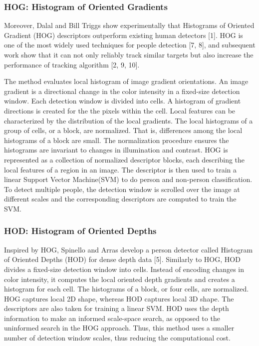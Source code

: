 \documentclass[paper=a4, fontsize=11pt]{scrartcl}
\numberwithin{equation}{section}		%
\numberwithin{figure}{section}			%
\numberwithin{table}{section}				%
\begin{document}
\subsubsection{HOG: Histogram of Oriented Gradients}

Moreover, Dalal and Bill Triggs show experimentally that Histograms of Oriented Gradient (HOG) descriptors outperform existing human detectors [1]. HOG is one of the most widely used techniques for people detection [7, 8], and subsequent work show that it can not only reliably track similar targets but also increase the performance of tracking algorithm [2, 9, 10].

The method evaluates local histogram of image gradient orientations. An image gradient is a directional change in the color intensity in a fixed-size detection window. Each detection window is divided into cells. A histogram of gradient directions is created for the the pixels within the cell. Local features can be characterized by the distribution of the local gradients. The local histograms of a group of cells, or a block, are normalized. That is, differences among the local histograms of a block are small. The normalization procedure ensures the histograms are invariant to changes in illumination and contrast. HOG is represented as a collection of normalized descriptor blocks, each describing the local features of a region in an image. The descriptor is then used to train a linear Support Vector Machine(SVM) to do person and non-person classification. To detect multiple people, the detection window is scrolled over the image at different scales and the corresponding descriptors are computed to train the SVM.

\subsubsection{HOD: Histogram of Oriented Depths}

Inspired by HOG, Spinello and Arras develop a person detector called Histogram of Oriented Depths (HOD) for dense depth data [5]. Similarly to HOG, HOD divides a fixed-size detection window into cells. Instead of encoding changes in color intensity, it computes the local oriented depth gradients and creates a histogram for each cell. The histograms of a block, or four cells, are normalized. HOG captures local 2D shape, whereas HOD captures local 3D shape. The descriptors are also taken for training a linear SVM. HOD uses the depth information to make an informed scale-space search, as opposed to the uninformed search in the HOG approach. Thus, this method uses a smaller number of detection window scales, thus reducing the computational cost.
\end{document}
